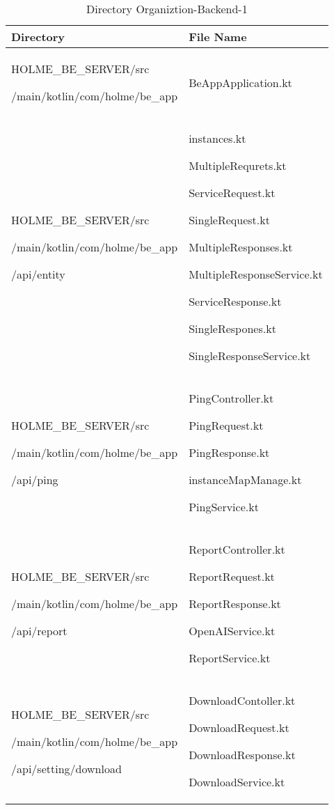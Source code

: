 \documentclass[conference]{IEEEtran}
\begin{document}
\begin{table}[h]
\caption{Directory Organiztion-Backend-1}
\def\arraystretch{1.24} \small
    \begin{tabular}{|p{3.9cm}|p{3.9cm}|}
        \hline
        Directory & File Name \\ \hline
          HOLME\_BE\_SERVER/src\par/main/kotlin/com/holme/be\_app & BeAppApplication.kt \\ \hline
          HOLME\_BE\_SERVER/src\par/main/kotlin/com/holme/be\_app\par/api/entity & instances.kt \par MultipleRequrets.kt \par ServiceRequest.kt \par SingleRequest.kt \par MultipleResponses.kt \par MultipleResponseService.kt \par ServiceResponse.kt \par SingleRespones.kt \par SingleResponseService.kt\\ \hline
          HOLME\_BE\_SERVER/src\par/main/kotlin/com/holme/be\_app\par/api/ping& PingController.kt\par PingRequest.kt \par PingResponse.kt \par instanceMapManage.kt \par PingService.kt \\ \hline
          HOLME\_BE\_SERVER/src\par/main/kotlin/com/holme/be\_app\par/api/report & ReportController.kt\par ReportRequest.kt \par ReportResponse.kt \par OpenAIService.kt \par ReportService.kt \\ \hline
          HOLME\_BE\_SERVER/src\par/main/kotlin/com/holme/be\_app\par/api/setting/download & DownloadContoller.kt \par DownloadRequest.kt \par DownloadResponse.kt \par DownloadService.kt \\ \hline

\end{tabular}
\end{table}
\end{document}
